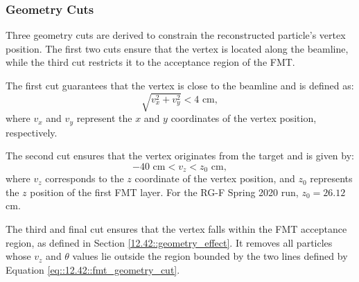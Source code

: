 \subsubsection{Geometry Cuts}
\label{13.22::geometry_cuts}
    Three geometry cuts are derived to constrain the reconstructed particle's vertex position.
    The first two cuts ensure that the vertex is located along the beamline, while the third cut restricts it to the acceptance region of the FMT.

    The first cut guarantees that the vertex is close to the beamline and is defined as:
    \begin{equation*}
        \sqrt{v_x^2 + v_y^2} < 4 \text{ cm},
    \end{equation*}
    where $v_x$ and $v_y$ represent the $x$ and $y$ coordinates of the vertex position, respectively.

    The second cut ensures that the vertex originates from the target and is given by:
    \begin{equation*}
        -40 \text{ cm} < v_z < z_0 \text{ cm},
    \end{equation*}
    where $v_z$ corresponds to the $z$ coordinate of the vertex position, and $z_0$ represents the $z$ position of the first FMT layer.
    For the RG-F Spring 2020 run, $z_0 = 26.12$ cm.

    The third and final cut ensures that the vertex falls within the FMT acceptance region, as defined in Section \ref{12.42::geometry_effect}.
    It removes all particles whose $v_z$ and $\theta$ values lie outside the region bounded by the two lines defined by Equation \eqref{eq::12.42::fmt_geometry_cut}.
